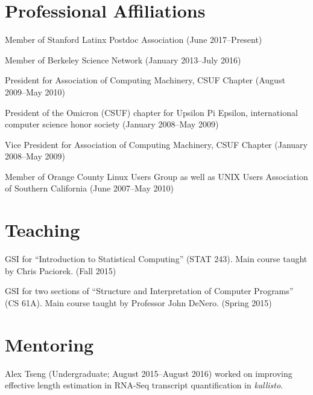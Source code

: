 \documentclass[11pt,notitlepage]{article} %
\begin{document}
\bigskip
\section*{Professional Affiliations}
\medskip
Member of Stanford Latinx Postdoc Association
(June 2017--Present)

\medskip

Member of Berkeley Science Network
(January 2013--July 2016)

\medskip

President for Association of Computing Machinery, CSUF Chapter
(August 2009--May 2010)

\medskip

President of the Omicron (CSUF) chapter for Upsilon Pi Epsilon,
international computer science honor society (January 2008--May 2009)

\medskip

Vice President for Association of Computing Machinery, CSUF Chapter
(January 2008--May 2009)

\medskip

Member of Orange County Linux Users Group as well as UNIX Users
Association of Southern California (June 2007--May 2010)



\bigskip
\section*{Teaching}
\medskip
GSI for ``Introduction to Statistical Computing'' (STAT 243). Main course taught
by Chris Paciorek. (Fall 2015)

\medskip

GSI for two sections of ``Structure and Interpretation of Computer Programs''
(CS 61A). Main course taught by Professor John DeNero. (Spring 2015)

\bigskip
\section*{Mentoring}
Alex Tseng (Undergraduate; August 2015--August 2016) worked on improving effective length estimation in RNA-Seq transcript quantification in \emph{kallisto}.
\end{document}
